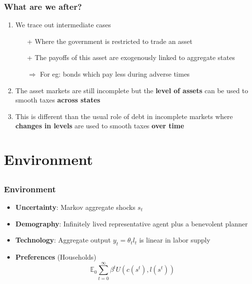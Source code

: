 \documentclass{beamer}
\begin{document}
\begin{frame}
\frametitle{What are we after?}

\begin{enumerate}
\item We trace out intermediate cases 
\begin{itemize}
\item [+] Where the government is restricted to trade an asset
\item [+] The payoffs of this asset are exogenously linked to aggregate states
 
 $\Longrightarrow$ For eg: bonds which pay less during adverse times

 \end{itemize}
\item The asset markets are still incomplete but the {\color{red} \textbf{level of assets} }can be used to smooth taxes {\color{red} \textbf{ across  states}}
\item This is different than the usual role of debt in incomplete markets where{ \color{red} \textbf{changes in levels}} are used to smooth taxes {\color{red}  \textbf{ over  time}}
\end{enumerate}

\end{frame}


\section{Environment}
\subsection{}

\begin{frame}
 \frametitle{Environment}
 \begin{itemize}
 \item \textbf{Uncertainty}: Markov aggregate shocks $s_t$
  \item \textbf{Demography}: Infinitely lived representative agent plus a benevolent planner
  \item \textbf{Technology}: Aggregate output  $y_t=\theta_{t} l_{t}$ is linear in labor supply
  \item \textbf{Preferences }(Households)
  \begin{equation*}
\mathbb{E}_{0}\sum_{t=0}^{\infty } \beta^t  U\left(
c(s^t),l(s^t)\right)  \label{utility lifetime}
\end{equation*}%
 \end{itemize}

\end{frame}
\end{document}

